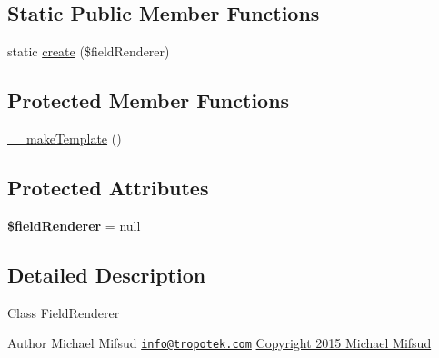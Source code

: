\subsection*{Static Public Member Functions}
\begin{DoxyCompactItemize}
\item 
static \hyperlink{classTk_1_1Form_1_1Renderer_1_1Dom_1_1FieldGroup_aa1013df31e1b017649d80ce0c3ac5b0c}{create} (\$field\+Renderer)
\end{DoxyCompactItemize}
\subsection*{Protected Member Functions}
\begin{DoxyCompactItemize}
\item 
\hyperlink{classTk_1_1Form_1_1Renderer_1_1Dom_1_1FieldGroup_a2455b4a6397f974eafc80e8867b8317f}{\+\_\+\+\_\+make\+Template} ()
\end{DoxyCompactItemize}
\subsection*{Protected Attributes}
\begin{DoxyCompactItemize}
\item 
\hypertarget{classTk_1_1Form_1_1Renderer_1_1Dom_1_1FieldGroup_a039034321cda33c40f800946faa02955}{{\bfseries \$field\+Renderer} = null}\label{classTk_1_1Form_1_1Renderer_1_1Dom_1_1FieldGroup_a039034321cda33c40f800946faa02955}

\end{DoxyCompactItemize}


\subsection{Detailed Description}
Class Field\+Renderer

\begin{DoxyAuthor}{Author}
Michael Mifsud \href{mailto:info@tropotek.com}{\tt info@tropotek.\+com} \hyperlink{}{Copyright 2015 Michael Mifsud }
\end{DoxyAuthor}



